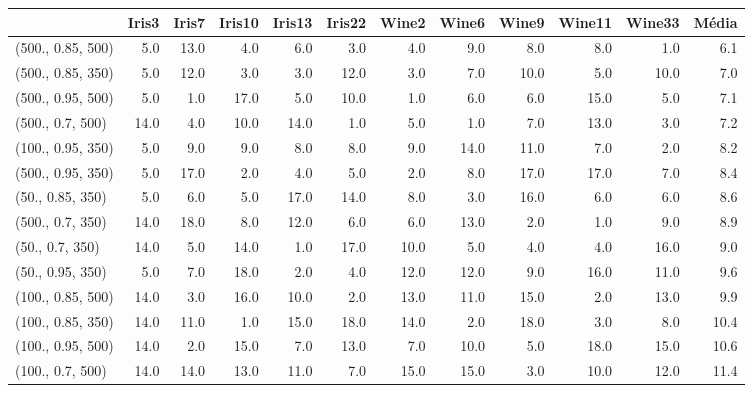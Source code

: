 \begin{table}
\centering
\label{tab:ranks_Simulat}
\begin{tabular}{lrrrrrrrrrrr}
\toprule
{} &  Iris3 &  Iris7 &  Iris10 &  Iris13 &  Iris22 &  Wine2 &  Wine6 &  Wine9 &  Wine11 &  Wine33 &  Média \\
\midrule
(500., 0.85, 500) &    5.0 &   13.0 &     4.0 &     6.0 &     3.0 &    4.0 &    9.0 &    8.0 &     8.0 &     1.0 &    6.1 \\
(500., 0.85, 350) &    5.0 &   12.0 &     3.0 &     3.0 &    12.0 &    3.0 &    7.0 &   10.0 &     5.0 &    10.0 &    7.0 \\
(500., 0.95, 500) &    5.0 &    1.0 &    17.0 &     5.0 &    10.0 &    1.0 &    6.0 &    6.0 &    15.0 &     5.0 &    7.1 \\
(500., 0.7, 500)  &   14.0 &    4.0 &    10.0 &    14.0 &     1.0 &    5.0 &    1.0 &    7.0 &    13.0 &     3.0 &    7.2 \\
(100., 0.95, 350) &    5.0 &    9.0 &     9.0 &     8.0 &     8.0 &    9.0 &   14.0 &   11.0 &     7.0 &     2.0 &    8.2 \\
(500., 0.95, 350) &    5.0 &   17.0 &     2.0 &     4.0 &     5.0 &    2.0 &    8.0 &   17.0 &    17.0 &     7.0 &    8.4 \\
(50., 0.85, 350)  &    5.0 &    6.0 &     5.0 &    17.0 &    14.0 &    8.0 &    3.0 &   16.0 &     6.0 &     6.0 &    8.6 \\
(500., 0.7, 350)  &   14.0 &   18.0 &     8.0 &    12.0 &     6.0 &    6.0 &   13.0 &    2.0 &     1.0 &     9.0 &    8.9 \\
(50., 0.7, 350)   &   14.0 &    5.0 &    14.0 &     1.0 &    17.0 &   10.0 &    5.0 &    4.0 &     4.0 &    16.0 &    9.0 \\
(50., 0.95, 350)  &    5.0 &    7.0 &    18.0 &     2.0 &     4.0 &   12.0 &   12.0 &    9.0 &    16.0 &    11.0 &    9.6 \\
(100., 0.85, 500) &   14.0 &    3.0 &    16.0 &    10.0 &     2.0 &   13.0 &   11.0 &   15.0 &     2.0 &    13.0 &    9.9 \\
(100., 0.85, 350) &   14.0 &   11.0 &     1.0 &    15.0 &    18.0 &   14.0 &    2.0 &   18.0 &     3.0 &     8.0 &   10.4 \\
(100., 0.95, 500) &   14.0 &    2.0 &    15.0 &     7.0 &    13.0 &    7.0 &   10.0 &    5.0 &    18.0 &    15.0 &   10.6 \\
(100., 0.7, 500)  &   14.0 &   14.0 &    13.0 &    11.0 &     7.0 &   15.0 &   15.0 &    3.0 &    10.0 &    12.0 &   11.4 \\

\end{tabular}
\end{table}
